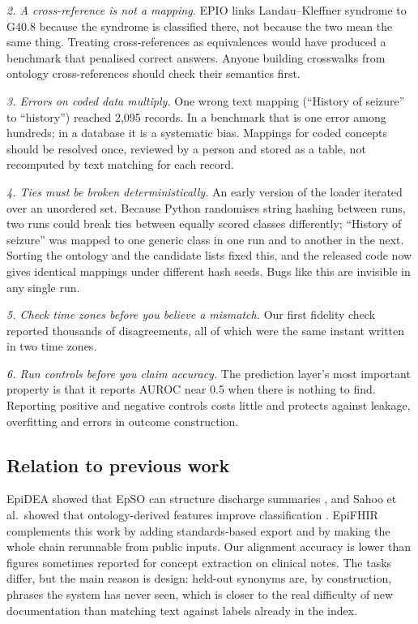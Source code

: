 \documentclass[preprint,12pt]{elsarticle}
\begin{document}
\textit{2. A cross-reference is not a mapping.} EPIO links Landau--Kleffner syndrome to G40.8 because the syndrome is classified there, not because the two mean the same thing. Treating cross-references as equivalences would have produced a benchmark that penalised correct answers. Anyone building crosswalks from ontology cross-references should check their semantics first.

\textit{3. Errors on coded data multiply.} One wrong text mapping (``History of seizure'' to ``history'') reached 2,095 records. In a benchmark that is one error among hundreds; in a database it is a systematic bias. Mappings for coded concepts should be resolved once, reviewed by a person and stored as a table, not recomputed by text matching for each record.

\textit{4. Ties must be broken deterministically.} An early version of the loader iterated over an unordered set. Because Python randomises string hashing between runs, two runs could break ties between equally scored classes differently; ``History of seizure'' was mapped to one generic class in one run and to another in the next. Sorting the ontology and the candidate lists fixed this, and the released code now gives identical mappings under different hash seeds. Bugs like this are invisible in any single run.

\textit{5. Check time zones before you believe a mismatch.} Our first fidelity check reported thousands of disagreements, all of which were the same instant written in two time zones.

\textit{6. Run controls before you claim accuracy.} The prediction layer's most important property is that it reports AUROC near 0.5 when there is nothing to find. Reporting positive and negative controls costs little and protects against leakage, overfitting and errors in outcome construction.

\subsection{Relation to previous work}
EpiDEA showed that EpSO can structure discharge summaries \cite{cui2012}, and Sahoo et al.\ showed that ontology-derived features improve classification \cite{sahoo2022}. EpiFHIR complements this work by adding standards-based export and by making the whole chain rerunnable from public inputs. Our alignment accuracy is lower than figures sometimes reported for concept extraction on clinical notes. The tasks differ, but the main reason is design: held-out synonyms are, by construction, phrases the system has never seen, which is closer to the real difficulty of new documentation than matching text against labels already in the index.
\end{document}
